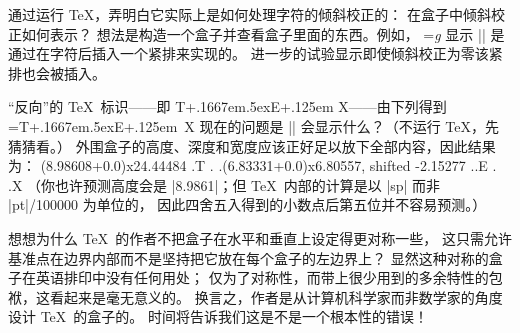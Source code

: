 \dangerexercise 通过运行 \TeX ，弄明白它实际上是如何处理字符的倾斜校正的：
在盒子中倾斜校正如何表示？
\answer 想法是构造一个盒子并查看盒子里面的东西。例如，
\begintt
{}=\hbox{\sl g\/} 
\endtt
显示 |\/| 是通过在字符后插入一个紧排来实现的。
进一步的试验显示即使倾斜校正为零该紧排也会被插入。

\dangerexercise ``反向''的 \TeX\ 标识——即
T\kern+.1667em\raise.5ex\hbox{E}\kern+.125em X——由下列得到
\begintt
{}=\hbox{T\kern+.1667em\raise.5ex\hbox{E}\kern+.125em X}
\endtt
现在的问题是 || 会显示什么？（不运行 \TeX ，先猜猜看。）
\answer 外围盒子的高度、深度和宽度应该正好足以放下全部内容，因此结果为：
\begintt
\hbox(8.98608+0.0)x24.44484
.\tenrm T
.
.\hbox(6.83331+0.0)x6.80557, shifted -2.15277
..\tenrm E
.
.\tenrm X
\endtt
（你也许预测高度会是 |8.9861|；但 \TeX\ 内部的计算是以 |sp| 而非 |pt|/100000 为单位的，
因此四舍五入得到的小数点后第五位并不容易预测。）

\dangerexercise 想想为什么 \TeX\ 的作者不把盒子在水平和垂直上设定得更对称一些，
这只需允许基准点在边界内部而不是坚持把它放在每个盒子的左边界上？
\answer 显然这种对称的盒子在英语排印中没有任何用处；
仅为了对称性，而带上很少用到的多余特性的包袱，这看起来是毫无意义的。
换言之，作者是从计算机科学家而非数学家的角度设计 \TeX\ 的盒子的。
时间将告诉我们这是不是一个根本性的错误！

